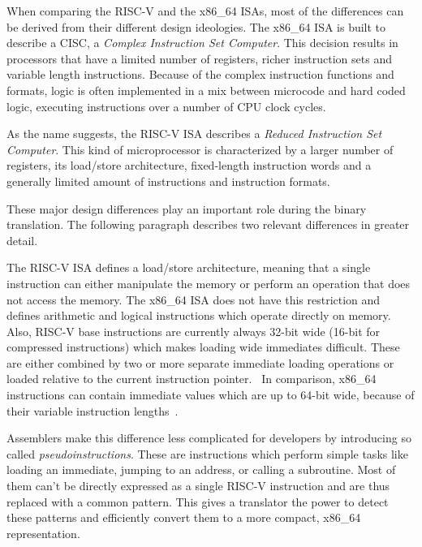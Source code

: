 \documentclass[course=eragp]{aspdoc}
\begin{document}
When comparing the RISC-V and the x86\_64 ISAs, most of the differences can be derived from their
different design ideologies. The x86\_64 ISA is built to describe a CISC, a \emph{Complex Instruction Set Computer}.
This decision results in processors that have a limited number of registers, richer instruction sets and variable length
instructions. Because of the complex instruction functions and formats, logic is often implemented
in a mix between microcode and hard coded logic, executing instructions over a number of CPU clock
cycles.~\cite{RISCvCISC}

\par

As the name suggests, the
RISC-V ISA describes a \emph{Reduced Instruction Set Computer}. This kind of microprocessor is
characterized by a larger number of
registers, its load/store architecture, fixed-length instruction words and a generally limited
amount of instructions and instruction formats.~\cite{RISCvCISC}

\par

These major design differences play an important role during the binary translation. The following
paragraph describes two relevant differences in greater detail.

\par

The RISC-V ISA defines a load/store architecture, meaning that a single instruction can either
manipulate the memory or perform an operation that does not access the memory. The x86\_64 ISA
does not have this restriction and defines arithmetic and logical instructions which operate
directly on memory. Also, RISC-V base instructions are currently always
32-bit wide (16-bit for compressed instructions) which makes loading wide
immediates difficult. These are either combined by two or more separate immediate loading operations
or loaded relative to the current instruction pointer.~\cite{rvspec} In comparison, x86\_64 instructions
can contain immediate values which are up to 64-bit wide, because
of their variable instruction lengths~\cite{intel2017man}.

\par

Assemblers make this difference less complicated for developers by introducing so called
\textit{pseudoinstructions}. These are instructions which perform simple tasks like loading an
immediate, jumping to an address, or calling a subroutine. Most of them can't be directly expressed
as a single RISC-V instruction and are thus replaced with a common pattern. This gives a translator
the power to detect these patterns and efficiently convert them to a more compact, x86\_64 representation.
\end{document}
